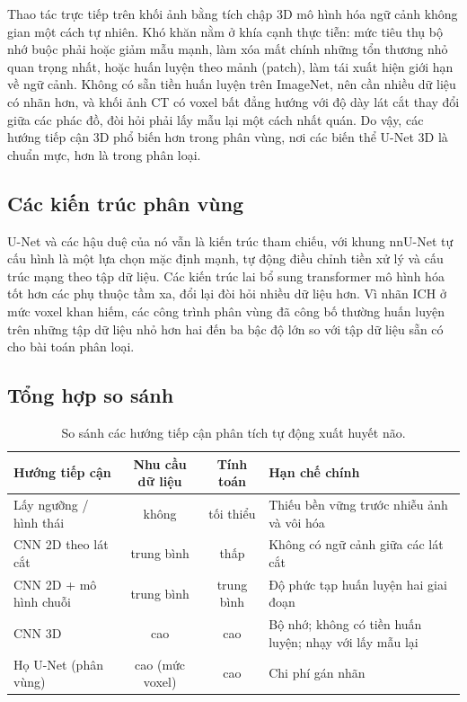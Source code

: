 Thao tác trực tiếp trên khối ảnh bằng tích chập 3D mô hình hóa ngữ cảnh không
gian một cách tự nhiên. Khó khăn nằm ở khía cạnh thực tiễn: mức tiêu thụ bộ nhớ
buộc phải hoặc giảm mẫu mạnh, làm xóa mất chính những tổn thương nhỏ quan trọng
nhất, hoặc huấn luyện theo mảnh (patch), làm tái xuất hiện giới hạn về ngữ cảnh.
Không có sẵn tiền huấn luyện trên ImageNet, nên cần nhiều dữ liệu có nhãn hơn, và
khối ảnh CT có voxel bất đẳng hướng với độ dày lát cắt thay đổi giữa các phác đồ,
đòi hỏi phải lấy mẫu lại một cách nhất quán. Do vậy, các hướng tiếp cận 3D phổ
biến hơn trong phân vùng, nơi các biến thể U-Net 3D là chuẩn mực, hơn là trong
phân loại.

\subsection{Các kiến trúc phân vùng}

U-Net và các hậu duệ của nó vẫn là kiến trúc tham chiếu, với khung nnU-Net tự
cấu hình là một lựa chọn mặc định mạnh, tự động điều chỉnh tiền xử lý và cấu trúc
mạng theo tập dữ liệu. Các kiến trúc lai bổ sung transformer mô hình hóa tốt hơn
các phụ thuộc tầm xa, đổi lại đòi hỏi nhiều dữ liệu hơn. Vì nhãn ICH ở mức voxel
khan hiếm, các công trình phân vùng đã công bố thường huấn luyện trên những tập
dữ liệu nhỏ hơn hai đến ba bậc độ lớn so với tập dữ liệu sẵn có cho bài toán phân
loại.

\subsection{Tổng hợp so sánh}

\begin{table}[H]
\centering
\small
\begin{tabularx}{\textwidth}{@{}l c c X@{}}
\toprule
\textbf{Hướng tiếp cận} & \textbf{Nhu cầu dữ liệu} & \textbf{Tính toán} & \textbf{Hạn chế chính} \\
\midrule
Lấy ngưỡng / hình thái & không & tối thiểu & Thiếu bền vững trước nhiễu ảnh và vôi hóa \\
CNN 2D theo lát cắt & trung bình & thấp & Không có ngữ cảnh giữa các lát cắt \\
CNN 2D + mô hình chuỗi & trung bình & trung bình & Độ phức tạp huấn luyện hai giai đoạn \\
CNN 3D & cao & cao & Bộ nhớ; không có tiền huấn luyện; nhạy với lấy mẫu lại \\
Họ U-Net (phân vùng) & cao (mức voxel) & cao & Chi phí gán nhãn \\
\bottomrule
\end{tabularx}
\caption{So sánh các hướng tiếp cận phân tích tự động xuất huyết não.}
\label{tab:methods}
\end{table}

